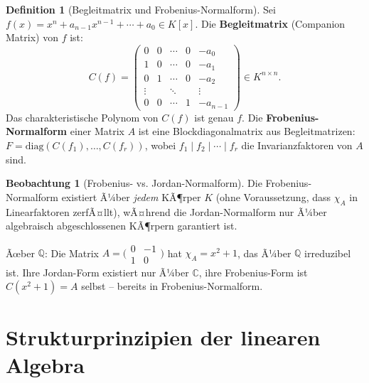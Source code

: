 ﻿\documentclass[a4paper,12pt]{report}
\theoremstyle{definition}
\newtheorem{definition}{Definition}
\newtheorem{beobachtung}{Beobachtung}
\begin{document}
\begin{definition}[Begleitmatrix und Frobenius-Normalform]
    Sei $f(x) = x^n + a_{n-1}x^{n-1} + \cdots + a_0 \in K[x]$.
    Die \textbf{Begleitmatrix} (Companion Matrix) von $f$ ist:
    \[
        C(f) = \begin{pmatrix}
            0 & 0 & \cdots & 0 & -a_0 \\
            1 & 0 & \cdots & 0 & -a_1 \\
            0 & 1 & \cdots & 0 & -a_2 \\
            \vdots & & \ddots & & \vdots \\
            0 & 0 & \cdots & 1 & -a_{n-1}
        \end{pmatrix} \in K^{n \times n}.
    \]
    Das charakteristische Polynom von $C(f)$ ist genau $f$.
    Die \textbf{Frobenius-Normalform} einer Matrix $A$ ist eine
    Blockdiagonalmatrix aus Begleitmatrizen:
    $F = \mathrm{diag}(C(f_1), \ldots, C(f_r))$, wobei
    $f_1 \mid f_2 \mid \cdots \mid f_r$ die Invarianzfaktoren von $A$ sind.
\end{definition}

\begin{beobachtung}[Frobenius- vs. Jordan-Normalform]
    Die Frobenius-Normalform existiert Ã¼ber \emph{jedem} KÃ¶rper $K$
    (ohne Voraussetzung, dass $\chi_A$ in Linearfaktoren zerfÃ¤llt),
    wÃ¤hrend die Jordan-Normalform nur Ã¼ber algebraisch abgeschlossenen
    KÃ¶rpern garantiert ist.

    Ãœber $\mathbb{Q}$: Die Matrix $A = \bigl(\begin{smallmatrix}0&-1\\1&0\end{smallmatrix}\bigr)$
    hat $\chi_A = x^2 + 1$, das Ã¼ber $\mathbb{Q}$ irreduzibel ist.
    Ihre Jordan-Form existiert nur Ã¼ber $\mathbb{C}$, ihre Frobenius-Form
    ist $C(x^2+1) = A$ selbst -- bereits in Frobenius-Normalform.
\end{beobachtung}

\chapter{Strukturprinzipien der linearen Algebra}
\end{document}
